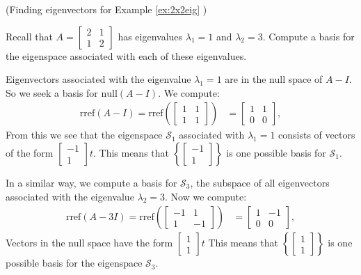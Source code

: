 \documentclass{ximera}
\begin{document}
\begin{example}\label{ex:eigvect2x2eig} (Finding eigenvectors for Example \ref{ex:2x2eig} )
    
Recall that $A=\begin{bmatrix} 2& 1\\ 1&2
\end{bmatrix}$ has eigenvalues $\lambda_1=1$ and $\lambda_2=3$.  Compute a basis for the eigenspace associated with each of these eigenvalues.
\begin{explanation}
Eigenvectors associated with the eigenvalue $\lambda_1=1$ are in the null space of $A-I$.  So we seek a basis for $\mbox{null}(A-I)$.  We compute:
\begin{align*}\mbox{rref}(A-I)=\mbox{rref}\left(\begin{bmatrix}1&1\\1&1\end{bmatrix}\right)&=\begin{bmatrix}1&1\\0&0\end{bmatrix},
\end{align*}
From this we see that the eigenspace $\mathcal{S}_1$ associated with $\lambda_1=1$ consists of vectors of the form $\begin{bmatrix}-1\\1\end{bmatrix}t$.
This means that $\left\{\begin{bmatrix}-1\\1\end{bmatrix}\right\}$ is one possible basis for $\mathcal{S}_1$.
    
In a similar way, we compute a basis for $\mathcal{S}_3$, the subspace of all eigenvectors associated with the eigenvalue $\lambda_2=3$.  Now we compute:
\begin{align*}\mbox{rref}(A-3I)=\mbox{rref}\left(\begin{bmatrix}-1&1\\1&-1\end{bmatrix}\right)&=\begin{bmatrix}1&-1\\0&0\end{bmatrix},
\end{align*}
Vectors in the null space have the form $\begin{bmatrix}1\\1\end{bmatrix}t$ This means that $\left\{\begin{bmatrix}1\\1\end{bmatrix}\right\}$ is one possible basis for the eigenspace $\mathcal{S}_3$.
\end{explanation}
\end{example}
    
\end{document}
